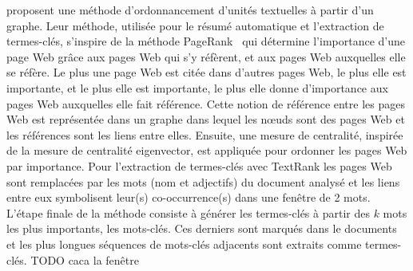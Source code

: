      proposent une méthode d'ordonnancement
    d'unités textuelles à partir d'un graphe. Leur méthode, utilisée pour le
    résumé automatique et l'extraction de termes-clés, s'inspire de la méthode
    PageRank~\cite{brin1998pagerank} qui détermine l'importance d'une page Web
    grâce aux pages Web qui s'y réfèrent, et aux pages Web auxquelles elle se
    réfère. Le plus une page Web est citée dans d'autres pages Web, le plus elle
    est importante, et le plus elle est importante, le plus elle donne
    d'importance aux pages Web auxquelles elle fait référence. Cette notion de
    référence entre les pages Web est représentée dans un graphe dans lequel les
    n\oe{}uds sont des pages Web et les références sont les liens entre elles.
    Ensuite, une mesure de centralité, inspirée de la mesure de centralité
    eigenvector, est appliquée pour ordonner les pages Web par importance. Pour
    l'extraction de termes-clés avec TextRank les pages Web sont remplacées par
    les mots (nom et adjectifs) du document analysé et les liens entre eux
    symbolisent leur(s) co-occurrence(s) dans une fenêtre de 2 mots. L'étape
    finale de la méthode consiste à générer les termes-clés à partir des $k$
    mots les plus importants, les mots-clés. Ces derniers sont marqués dans le
    documents et les plus longues séquences de mots-clés adjacents sont extraits
    comme termes-clés. TODO caca la fenêtre

